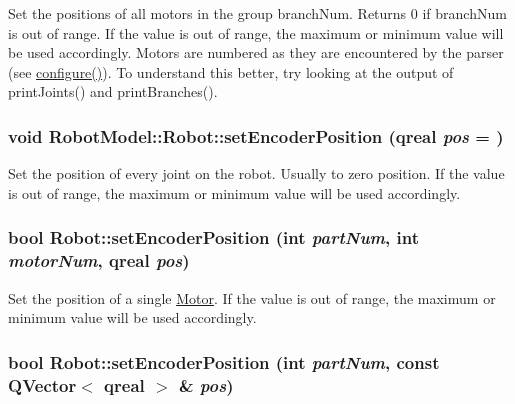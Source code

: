 Set the positions of all motors in the group branchNum. Returns 0 if branchNum is out of range. If the value is out of range, the maximum or minimum value will be used accordingly. Motors are numbered as they are encountered by the parser (see \hyperlink{class_robot_model_1_1_robot_a9ca9887b212f3233d101d95854cf2c79}{configure()}). To understand this better, try looking at the output of printJoints() and printBranches(). \hypertarget{class_robot_model_1_1_robot_a99dfb27d656fbec65adc1c3881d63f6f}{
\subsubsection[{setEncoderPosition}]{\setlength{\rightskip}{0pt plus 5cm}void RobotModel::Robot::setEncoderPosition (qreal {\em pos} = {})}}
\label{class_robot_model_1_1_robot_a99dfb27d656fbec65adc1c3881d63f6f}


Set the position of every joint on the robot. Usually to zero position. If the value is out of range, the maximum or minimum value will be used accordingly. \hypertarget{class_robot_model_1_1_robot_a08017bce09f838437534aec53d615ff6}{
\subsubsection[{setEncoderPosition}]{\setlength{\rightskip}{0pt plus 5cm}bool Robot::setEncoderPosition (int {\em partNum}, \/  int {\em motorNum}, \/  qreal {\em pos})}}
\label{class_robot_model_1_1_robot_a08017bce09f838437534aec53d615ff6}


Set the position of a single \hyperlink{class_robot_model_1_1_motor}{Motor}. If the value is out of range, the maximum or minimum value will be used accordingly. \hypertarget{class_robot_model_1_1_robot_ad68d3bd2d8edbca49704f8a5b01055a1}{
\subsubsection[{setEncoderPosition}]{\setlength{\rightskip}{0pt plus 5cm}bool Robot::setEncoderPosition (int {\em partNum}, \/  const QVector$<$ qreal $>$ \& {\em pos})}}
\label{class_robot_model_1_1_robot_ad68d3bd2d8edbca49704f8a5b01055a1}


